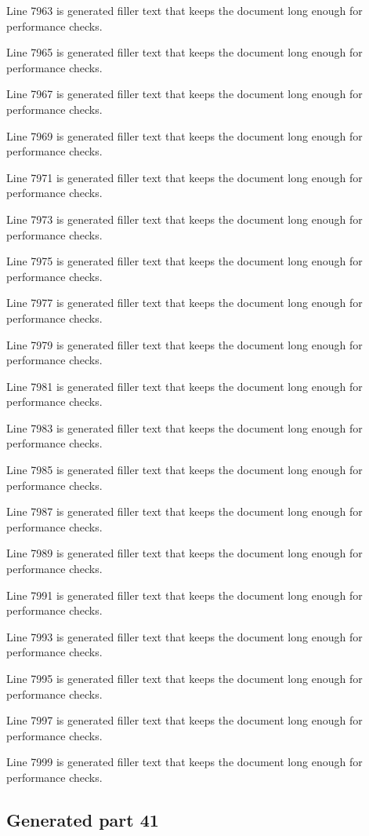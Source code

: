 Line 7963 is generated filler text that keeps the document long enough for performance checks.

Line 7965 is generated filler text that keeps the document long enough for performance checks.

Line 7967 is generated filler text that keeps the document long enough for performance checks.

Line 7969 is generated filler text that keeps the document long enough for performance checks.

Line 7971 is generated filler text that keeps the document long enough for performance checks.

Line 7973 is generated filler text that keeps the document long enough for performance checks.

Line 7975 is generated filler text that keeps the document long enough for performance checks.

Line 7977 is generated filler text that keeps the document long enough for performance checks.

Line 7979 is generated filler text that keeps the document long enough for performance checks.

Line 7981 is generated filler text that keeps the document long enough for performance checks.

Line 7983 is generated filler text that keeps the document long enough for performance checks.

Line 7985 is generated filler text that keeps the document long enough for performance checks.

Line 7987 is generated filler text that keeps the document long enough for performance checks.

Line 7989 is generated filler text that keeps the document long enough for performance checks.

Line 7991 is generated filler text that keeps the document long enough for performance checks.

Line 7993 is generated filler text that keeps the document long enough for performance checks.

Line 7995 is generated filler text that keeps the document long enough for performance checks.

Line 7997 is generated filler text that keeps the document long enough for performance checks.

Line 7999 is generated filler text that keeps the document long enough for performance checks.

\subsection{Generated part 41}

